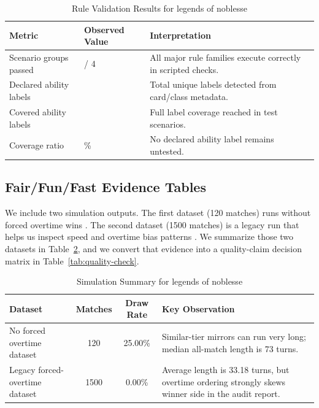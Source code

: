 \documentclass[12pt]{article}
\newcommand{\GameName}{legends of noblesse}
\begin{document}
\begin{table}[H]
\centering
\caption{Rule Validation Results for \GameName}
\label{tab:ability-results}
\small
\renewcommand{\arraystretch}{1.2}
\setlength{\tabcolsep}{5pt}
\begin{tabularx}{\textwidth}{|>{\raggedright\arraybackslash}p{3.2cm}|>{\centering\arraybackslash}p{2.0cm}|>{\raggedright\arraybackslash}X|}
\hline
\textbf{Metric} & \textbf{Observed Value} & \textbf{Interpretation} \\
\hline
Scenario groups passed & 4 / 4 & All major rule families execute correctly in scripted checks. \\
\hline
Declared ability labels & 56 & Total unique labels detected from card/class metadata. \\
\hline
Covered ability labels & 56 & Full label coverage reached in test scenarios. \\
\hline
Coverage ratio & 100\% & No declared ability label remains untested. \\
\hline
\end{tabularx}
\setlength{\tabcolsep}{6pt}
\normalsize
\renewcommand{\arraystretch}{1.0}
\end{table}

\subsection{Fair/Fun/Fast Evidence Tables}
We include two simulation outputs. The first dataset (120 matches) runs without forced overtime wins \cite{tier20summary,tier20strength}. The second dataset (1500 matches) is a legacy run that helps us inspect speed and overtime bias patterns \cite{tierlegacyraw,tier20report}.
We summarize those two datasets in Table~\ref{tab:sim-summary}, and we convert that evidence into a quality-claim decision matrix in Table~\ref{tab:quality-check}.

\begin{table}[H]
\centering
\caption{Simulation Summary for \GameName}
\label{tab:sim-summary}
\begin{tabular}{|p{4.7cm}|c|c|p{5.3cm}|}
\hline
\textbf{Dataset} & \textbf{Matches} & \textbf{Draw Rate} & \textbf{Key Observation} \\
\hline
No forced overtime dataset & 120 & 25.00\% & Similar-tier mirrors can run very long; median all-match length is 73 turns. \\
\hline
Legacy forced-overtime dataset & 1500 & 0.00\% & Average length is 33.18 turns, but overtime ordering strongly skews winner side in the audit report. \\
\hline
\end{tabular}
\end{table}
\end{document}
